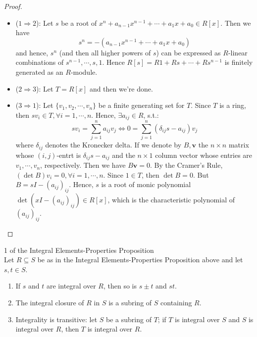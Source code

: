 \begin{proof}
    \begin{itemize}
        \item ($1\Rightarrow2$): Let $s$ be a root of $x^n+a_{n-1}x^{n-1} +\cdots+ a_1x+a_0 \in R[x]$. Then we have
        $$s^n= -(a_{n-1}x^{n-1} +\cdots+ a_1x+a_0)$$
        and hence, $s^n$ (and then all higher powers of $s$) can be expressed as $R$-linear combinations of $s^{n-1} ,\cdots, s,1$. Hence $R[s]= R1+Rs+ \cdots+Rs^{n-1}$ is finitely generated as an $R$-module.

        \item ($2\Rightarrow 3$): Let $T=R[x]$ and then we're done.
        \item ($3\Rightarrow1$): Let $\{v_1,v_2,\cdots, v_n\}$ be a finite generating set for $T$. Since $T$ is a ring, then $sv_i \in T, \forall i=1,\cdots, n$. Hence, $\exists a_{ij} \in R$, s.t.:
        $$sv_i= \sum_{j=1}^n a_{ij} v_j \Leftrightarrow 0= \sum_{j=1}^n (\delta_{ij}s-a_{ij})v_j$$
        where $\delta_{ij}$ denotes the Kronecker delta. If we denote by $B,\mathbf{v}$ the $n \times n$ matrix whose $(i,j)$-entrt is $\delta_{ij}s-a_{ij}$ and the $n\times 1$ column vector whose entries are $v_1 ,\cdots, v_n$, respectively. Then we have $B\mathbf{v}=0$. By the Cramer's Rule, $(\det B)v_i=0, \forall i=1,\cdots,n$. Since $1\in T$, then $\det B=0$. But $B= sI-(a_{ij})_{ij}$. Hence, $s$ is a root of monic polynomial $\det (xI-(a_{ij})_{ij}) \in R[x]$, which is the characteristic polynomial of $(a_{ij})_{ij}$. 
    \end{itemize}
\end{proof}

\begin{corollary}{1 of the Integral Elements-Properties Proposition}\\
Let $R\subseteq S$ be as in the Integral Elements-Properties Proposition above and let $s,t\in S$.
\begin{enumerate}
    \item If $s$ and $t$ are integral over $R$, then so is $s \pm t$ and $st$.
    \item The integral closure of $R$ in $S$ is a subring of $S$ containing $R$.
    \item Integrality is transitive: let $S$ be a subring of $T$; if $T$ is integral over $S$ and $S$ is integral over $R$, then $T$ is integral over $R$.
\end{enumerate}
\end{corollary}

